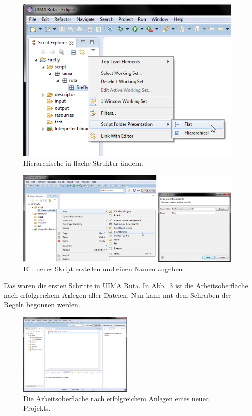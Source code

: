 \documentclass{article}
\begin{document}
\begin{figure}
\centering
\includegraphics[scale=0.5]{figs/capture(9).png}
\caption{Hierarchische in flache Struktur ändern.}
\label{workbench4}
\end{figure}

\begin{figure}
\centering
\includegraphics[width=1\textwidth]{figs/capture(10+11).png}
\caption{Ein neues Skript erstellen und einen Namen angeben.}
\label{newscript}
\end{figure}

\newpage
Das waren die ersten Schritte in UIMA Ruta. In Abb.~\ref{workbench5} ist die Arbeitsoberfläche nach erfolgreichem Anlegen aller Dateien. Nun kann mit dem Schreiben der Regeln begonnen werden.

\begin{figure}
\centering
\includegraphics[width=0.5\textwidth]{figs/capture(12).png}
\caption{Die Arbeitsoberfläche nach erfolgreichem Anlegen eines neuen Projekts.}
\label{workbench5}
\end{figure}
\end{document}
